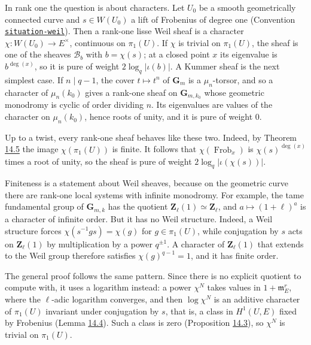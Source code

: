 \documentclass[11pt]{article}
\newcommand{\bpslug}[1]{\texttt{#1}}
\begin{document}
In rank one the question is about characters. Let \(U_0\) be a smooth geometrically connected curve and \(s\in W(U_0)\) a lift of Frobenius of degree one (Convention \hyperref[bp7]{\bpslug{situation-{}\allowbreak{}weil}}). Then a rank-one lisse Weil sheaf is a character \(\chi:W(U_0)\to E^\times\), continuous on \(\pi_1(U)\). If \(\chi\) is trivial on \(\pi_1(U)\), the sheaf is one of the sheaves \(\mathcal B_b\) with \(b=\chi(s)\); at a closed point \(x\) its eigenvalue is \(b^{\deg(x)}\), so it is pure of weight \(2\log_q|\iota(b)|\). A Kummer sheaf is the next simplest case. If \(n\mid q-1\), the cover \(t\mapsto t^n\) of \(\mathbf G_m\) is a \(\mu_n\)-torsor, and so a character of \(\mu_n(k_0)\) gives a rank-one sheaf on \(\mathbf G_{m,k_0}\) whose geometric monodromy is cyclic of order dividing \(n\). Its eigenvalues are values of the character on \(\mu_n(k_0)\), hence roots of unity, and it is pure of weight \(0\).

Up to a twist, every rank-one sheaf behaves like these two. Indeed, by Theorem \hyperref[bp58]{14.5} the image \(\chi(\pi_1(U))\) is finite. It follows that \(\chi(\operatorname{Frob}_x)\) is \(\chi(s)^{\deg(x)}\) times a root of unity, so the sheaf is pure of weight \(2\log_q|\iota(\chi(s))|\).

Finiteness is a statement about Weil sheaves, because on the geometric curve there are rank-one local systems with infinite monodromy. For example, the tame fundamental group of \(\mathbf G_{m,k}\) has the quotient \(\mathbf Z_\ell(1)\simeq\mathbf Z_\ell\), and \(a\mapsto(1+\ell)^a\) is a character of infinite order. But it has no Weil structure. Indeed, a Weil structure forces \(\chi(s^{-1}gs)=\chi(g)\) for \(g\in\pi_1(U)\), while conjugation by \(s\) acts on \(\mathbf Z_\ell(1)\) by multiplication by a power \(q^{\pm1}\). A character of \(\mathbf Z_\ell(1)\) that extends to the Weil group therefore satisfies \(\chi(g)^{q-1}=1\), and it has finite order.

The general proof follows the same pattern. Since there is no explicit quotient to compute with, it uses a logarithm instead: a power \(\chi^N\) takes values in \(1+\mathfrak m_E^r\), where the \(\ell\)-adic logarithm converges, and then \(\log\chi^N\) is an additive character of \(\pi_1(U)\) invariant under conjugation by \(s\), that is, a class in \(H^1(U,E)\) fixed by Frobenius (Lemma \hyperref[bp55]{14.4}). Such a class is zero (Proposition \hyperref[bp51]{14.3}), so \(\chi^N\) is trivial on \(\pi_1(U)\).
\end{document}
